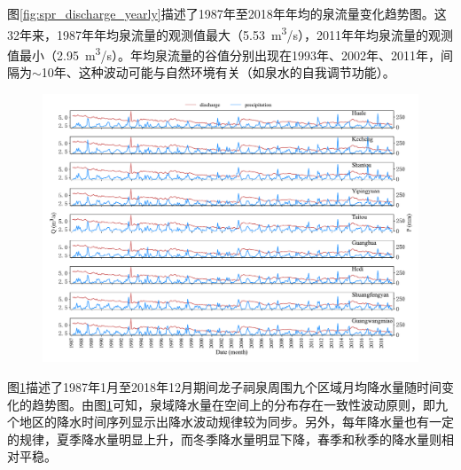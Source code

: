 图\ref{fig:spr_discharge_yearly}描述了1987年至2018年年均的泉流量变化趋势图。这32年来，1987年年均泉流量的观测值最大（\SI{5.53}{m^{3}/s}），2011年年均泉流量的观测值最小（\SI{2.95}{m^{3}/s}）。年均泉流量的谷值分别出现在1993年、2002年、2011年，间隔为$\sim$10年、这种波动可能与自然环境有关（如泉水的自我调节功能）。

\begin{figure}[!htbp]
  \vspace{-0.35cm}
  \centering
  \includegraphics[width=\textwidth]{Img/chap4_spr/spr_precipitation_monthly}
  \vspace{-1cm}
  \label{fig:spr_precipitation_monthly}
\end{figure}

图\ref{fig:spr_precipitation_monthly}描述了1987年1月至2018年12月期间龙子祠泉周围九个区域月均降水量随时间变化的趋势图。由图\ref{fig:spr_precipitation_monthly}可知，泉域降水量在空间上的分布存在一致性波动原则，即九个地区的降水时间序列显示出降水波动规律较为同步。另外，每年降水量也有一定的规律，夏季降水量明显上升，而冬季降水量明显下降，春季和秋季的降水量则相对平稳。

